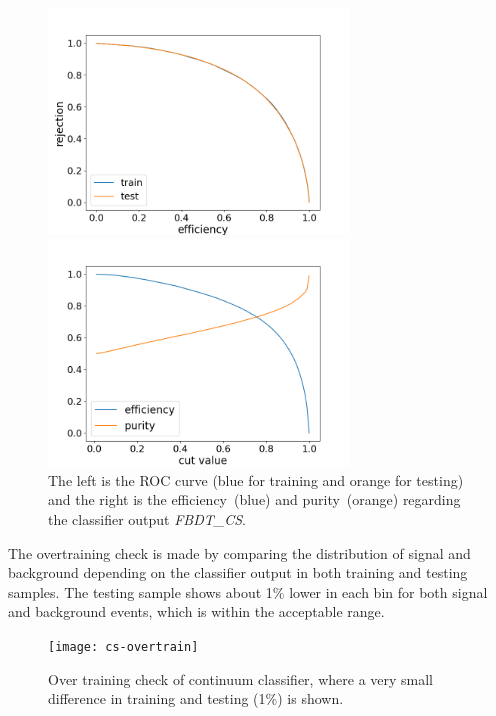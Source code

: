 \begin{figure}[htpb]
	\begin{minipage}[b]{0.5\linewidth}
		\centering 
		\includegraphics[height=6cm]{figures/ROC_CS}	
	\end{minipage}
	\begin{minipage}[b]{0.5\linewidth}
		\centering 
		\includegraphics[height=6cm]{figures/eff_CS}	
	\end{minipage}
\caption{The left is the ROC curve (blue for training and orange for testing)
	and the right is the efficiency~(blue) and purity~(orange) regarding the classifier output \textit{FBDT\_CS}.}
	\label{fig:cs_roc}
\end{figure}

The overtraining check is made by comparing the distribution of signal and background depending on the classifier output in both training and testing samples. The testing sample shows about 1\% lower in each bin for both signal and background events, which is within the acceptable range.  
\begin{figure}[htpb]
	\centering
	\texttt{[image: cs-overtrain]}
	\caption{Over training check of continuum classifier, where a very small difference in training and testing (1\%) is shown.}
\end{figure}


